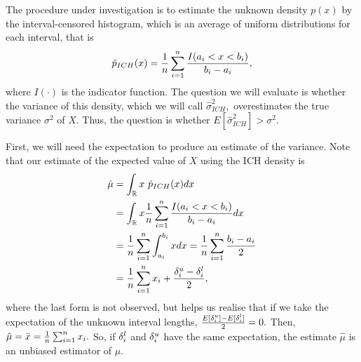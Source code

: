 The procedure under investigation is to estimate the unknown density $p(x)$ by the interval-censored histogram, which is an average of uniform distributions for each interval, that is $$\hat{p}_{ICH}(x) = \frac{1}{n}\sum_{i=1}^n \frac{I(a_i < x < b_i)}{b_i - a_i},$$  where $I(\cdot)$ is the indicator function. The question we will evaluate is whether the variance of this density, which we will call $\hat{\sigma}^2_{ICH},$ overestimates the true variance $\sigma^2$ of $X$. Thus, the question is whether $E[\hat{\sigma}^2_{ICH}] > \sigma^2.$

First, we will need the expectation to produce an estimate of the variance. Note that our estimate of the expected value of $X$ using the ICH density is
\begin{align}
\hat\mu &= \int_{\mathbb{R}} x ~ \hat{p}_{ICH}(x) dx \\
&= \int_{\mathbb{R}} x \frac{1}{n}\sum_{i=1}^n \frac{I(a_i < x < b_i)}{b_i - a_i} dx \\
&= \frac{1}{n}\sum_{i=1}^n  \int_{a_i}^{b_i} x dx
= \frac{1}{n}\sum_{i=1}^n \frac{b_i - a_i}{2} \\
&= \frac{1}{n}\sum_{i=1}^n x_i + \frac{{\delta^u_i} - {\delta^l_i}}{2},
\end{align}
where the last form is not observed, but helps us realise that if we take the expectation of the unknown interval lengths, $\frac{E[{\delta^u_i}] - E[{\delta^l_i}]}{2} = 0.$ Then, $\hat\mu = \bar{x} = \frac{1}{n}\sum_{i=1}^n x_i.$ So, if ${\delta^l_i}$ and ${\delta^u_i}$ have the same expectation, the estimate $\hat\mu$ is an unbiased estimator of $\mu$.

